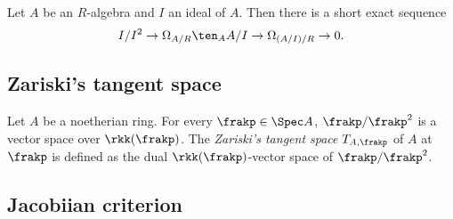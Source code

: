     \begin{theorem}\label{thm: the second exact sequence of differentials}
        Let \(A\) be an \(R\)-algebra and \(I\) an ideal of \(A\).
        Then there is a short exact sequence
        \[ I/I^2 \to \Omega_{A/R} \ten_A A/I \to \Omega_{(A/I)/R} \to 0. \]
    \end{theorem}

\subsection{Zariski's tangent space}

    \begin{definition}\label{def: Zariski's tangent space}
        Let \(A\) be a noetherian ring.
        For every $\frakp \in \Spec A$, \(\frakp/\frakp^2\) is a vector space over \(\rkk(\frakp)\).
        The \emph{Zariski's tangent space} $T_{A,\frakp}$ of \(A\) at \(\frakp\) is defined as the dual \(\rkk(\frakp)\)-vector space of \(\frakp/\frakp^2\).
    \end{definition}

    \begin{definition}\label{def: regular ring}
        
    \end{definition}

    \begin{proposition}\label{prop: regularity is stable under localization}
        
    \end{proposition}

    \begin{proposition}\label{prop: smoothness is geometric regularity}
        
    \end{proposition}

    \begin{example}\label{eg: regular but not smooth}
    \end{example}


\subsection{Jacobiian criterion}

